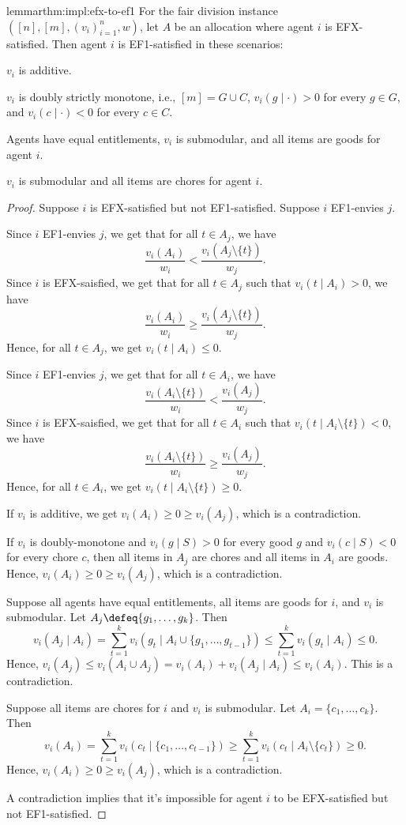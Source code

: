 \begin{restatable}{lemma}{rthm:impl:efx-to-ef1}
\label{thm:impl:efx-to-ef1}
For the fair division instance $([n], [m], (v_i)_{i=1}^n, w)$,
let $A$ be an allocation where agent $i$ is EFX-satisfied.
Then agent $i$ is EF1-satisfied in these scenarios:
\begin{tightenum}
\item $v_i$ is additive.
\item $v_i$ is doubly strictly monotone, i.e., $[m] = G \cup C$, $v_i(g \mid \cdot) > 0$
    for every $g \in G$, and $v_i(c \mid \cdot) < 0$ for every $c \in C$.
\item Agents have equal entitlements, $v_i$ is submodular, and all items are goods for agent $i$.
\item $v_i$ is submodular and all items are chores for agent $i$.
\end{tightenum}
\end{restatable}
\begin{proof}
Suppose $i$ is EFX-satisfied but not EF1-satisfied.
Suppose $i$ EF1-envies $j$.

Since $i$ EF1-envies $j$, we get that for all $t \in A_j$, we have
\[ \frac{v_i(A_i)}{w_i} < \frac{v_i(A_j \setminus \{t\})}{w_j}. \]
Since $i$ is EFX-saisfied, we get that
for all $t \in A_j$ such that $v_i(t \mid A_i) > 0$, we have
\[ \frac{v_i(A_i)}{w_i} \ge \frac{v_i(A_j \setminus \{t\})}{w_j}. \]
Hence, for all $t \in A_j$, we get $v_i(t \mid A_i) \le 0$.

Since $i$ EF1-envies $j$, we get that for all $t \in A_i$, we have
\[ \frac{v_i(A_i \setminus \{t\})}{w_i} < \frac{v_i(A_j)}{w_j}. \]
Since $i$ is EFX-saisfied, we get that
for all $t \in A_i$ such that $v_i(t \mid A_i \setminus \{t\}) < 0$, we have
\[ \frac{v_i(A_i \setminus \{t\})}{w_i} \ge \frac{v_i(A_j)}{w_j}. \]
Hence, for all $t \in A_i$, we get $v_i(t \mid A_i \setminus \{t\}) \ge 0$.

If $v_i$ is additive, we get $v_i(A_i) \ge 0 \ge v_i(A_j)$, which is a contradiction.

If $v_i$ is doubly-monotone and $v_i(g \mid S) > 0$ for every good $g$
and $v_i(c \mid S) < 0$ for every chore $c$, then
all items in $A_j$ are chores and all items in $A_i$ are goods.
Hence, $v_i(A_i) \ge 0 \ge v_i(A_j)$, which is a contradiction.

Suppose all agents have equal entitlements, all items are goods for $i$, and $v_i$ is submodular.
Let $A_j \defeq \{g_1, \ldots, g_k\}$. Then
\[ v_i(A_j \mid A_i) = \sum_{t=1}^k v_i(g_t \mid A_i \cup \{g_1, \ldots, g_{t-1}\})
\le \sum_{t=1}^k v_i(g_t \mid A_i) \le 0. \]
Hence, $v_i(A_j) \le v_i(A_i \cup A_j) = v_i(A_i) + v_i(A_j \mid A_i) \le v_i(A_i)$.
This is a contradiction.

Suppose all items are chores for $i$ and $v_i$ is submodular.
Let $A_i = \{c_1, \ldots, c_k\}$. Then
\[ v_i(A_i) = \sum_{t=1}^k v_i(c_t \mid \{c_1, \ldots, c_{t-1}\})
\ge \sum_{t=1}^k v_i(c_t \mid A_i \setminus \{c_t\}) \ge 0. \]
Hence, $v_i(A_i) \ge 0 \ge v_i(A_j)$, which is a contradiction.

A contradiction implies that it's impossible for agent $i$ to be
EFX-satisfied but not EF1-satisfied.
\end{proof}

